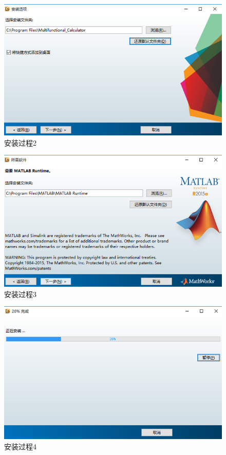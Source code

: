 \documentclass[UTF8]{ctexart}
\begin{document}
\begin{figure}[H]
\centering
\includegraphics[scale=0.5]{image/pic002.png}
\caption{安装过程2}
\label{fig:pic002}
\end{figure}

\begin{figure}[H]
\centering
\includegraphics[scale=0.5]{image/pic003.png}
\caption{安装过程3}
\label{fig:pic003}
\end{figure}

\begin{figure}[H]
\centering
\includegraphics[scale=0.5]{image/pic004.png}
\caption{安装过程4}
\label{fig:pic004}
\end{figure}
\end{document}
